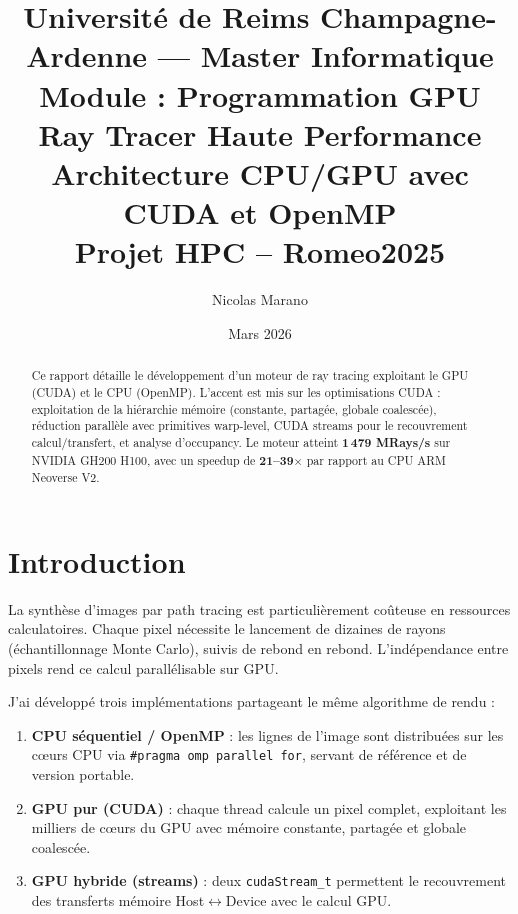 \documentclass[12pt,a4paper]{article}
\title{
    \vspace{-1cm}
    {\normalsize Universit\'{e} de Reims Champagne-Ardenne --- Master Informatique}\\[0.1cm]
    {\normalsize Module : Programmation GPU}\\[0.4cm]
    \textbf{Ray Tracer Haute Performance}\\[0.3cm]
    \large Architecture CPU/GPU avec CUDA et OpenMP\\[0.2cm]
    \normalsize Projet HPC -- Romeo2025
}
\author{Nicolas Marano}
\date{Mars 2026}
\begin{document}
\maketitle
\thispagestyle{empty}

\vspace{0.5cm}
\begin{abstract}
Ce rapport d\'{e}taille le d\'{e}veloppement d'un moteur de ray tracing exploitant le GPU (CUDA) et le CPU (OpenMP). L'accent est mis sur les optimisations CUDA : exploitation de la hi\'{e}rarchie m\'{e}moire (constante, partag\'{e}e, globale coalesc\'{e}e), r\'{e}duction parall\`{e}le avec primitives warp-level, CUDA streams pour le recouvrement calcul/transfert, et analyse d'occupancy. Le moteur atteint \textbf{1\,479 MRays/s} sur NVIDIA GH200 H100, avec un speedup de \textbf{21--39$\times$} par rapport au CPU ARM Neoverse V2.
\end{abstract}

\tableofcontents
\vspace{0.5cm}

\section{Introduction}

La synth\`{e}se d'images par path tracing est particuli\`{e}rement co\^{u}teuse en ressources calculatoires. Chaque pixel n\'{e}cessite le lancement de dizaines de rayons (\'{e}chantillonnage Monte Carlo), suivis de rebond en rebond. L'ind\'{e}pendance entre pixels rend ce calcul parall\'{e}lisable sur GPU.

J'ai d\'{e}velopp\'{e} trois impl\'{e}mentations partageant le m\^{e}me algorithme de rendu :
\begin{enumerate}
    \item \textbf{CPU s\'{e}quentiel / OpenMP} : les lignes de l'image sont distribu\'{e}es sur les c\oe urs CPU via \texttt{\#pragma omp parallel for}, servant de r\'{e}f\'{e}rence et de version portable.
    \item \textbf{GPU pur (CUDA)} : chaque thread calcule un pixel complet, exploitant les milliers de c\oe urs du GPU avec m\'{e}moire constante, partag\'{e}e et globale coalesc\'{e}e.
    \item \textbf{GPU hybride (streams)} : deux \texttt{cudaStream\_t} permettent le recouvrement des transferts m\'{e}moire Host$\leftrightarrow$Device avec le calcul GPU.
\end{enumerate}
\end{document}

